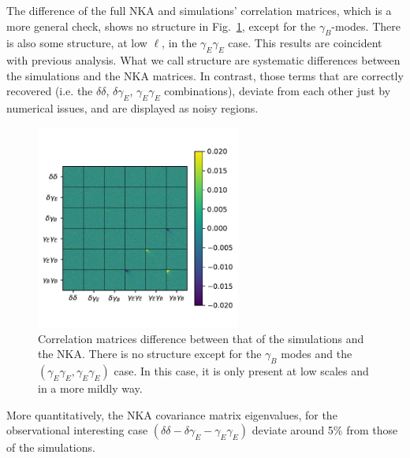 \documentclass[a4paper,11pt]{article}
\begin{document}
The difference of the full NKA and simulations' correlation matrices, which is
a more general check, shows no structure in Fig.~\ref{fig:diff_corr_1bin},
except for the $\gamma_B$-modes. There is also some structure, at low
$\ell$, in the $\gamma_E\gamma_E$ case. This results are coincident with
previous analysis. What we call structure are systematic differences between
the simulations and the NKA matrices. In contrast, those terms that are
correctly recovered (i.e. the $\delta \delta$, $\delta \gamma_E$, $\gamma_E
\gamma_E$ combinations), deviate from each other just by numerical issues, and
are displayed as noisy regions.

\begin{figure}[htb]
  \centering
  \includegraphics[width=0.6\textwidth]{./figures/sph_1bin_diff_corr.pdf}
  \caption{Correlation matrices difference between that of the simulations and
    the NKA. There is no structure except for the $\gamma_B$ modes and the
    $(\gamma_E\gamma_E, \gamma_E\gamma_E)$ case. In this case, it is only
    present at low scales and in a more mildly way.} 
  \label{fig:diff_corr_1bin}
\end{figure}

More quantitatively, the NKA covariance matrix eigenvalues, for the
observational interesting case $(\delta\delta-\delta\gamma_E-
\gamma_E\gamma_E)$ deviate around 5\% from those of the simulations. 
\end{document}
